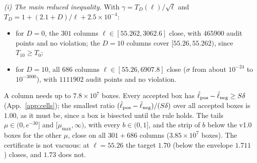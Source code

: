 \emph{(i) The main reduced inequality.}
With $\gamma=T_D(\ell)/\sqrt\ell$ and $T_D=1+(2.1+D)/\ell+2.5\times10^{-4}$:
\begin{itemize}
\item for $D=0$, the $301$ columns $\ell\in[55.262,3062.6]$ close, with $465900$ audit points and no violation; the $D=10$ columns cover $[55.26,55.262)$, since $T_{10}\ge T_0$;
\item for $D=10$, all $686$ columns $\ell\in[55.26,6907.8]$ close ($\sigma$ from about $10^{-24}$ to $10^{-3000}$), with $1111902$ audit points and no violation.
\end{itemize}
A column needs up to $7.8\times10^{7}$ boxes.
Every accepted box has $\hat\ell_{\rm pos}-\hat\ell_{\rm neg}\ge S\delta$ (App.~\ref{app:cells}); the smallest ratio $(\hat\ell_{\rm pos}-\hat\ell_{\rm neg})/(S\delta)$ over all accepted boxes is $1.00$, as it must be, since a box is bisected until the rule holds.
The tails $\mu\in(0,e^{-30}]$ and $[\mu_{\max},\infty)$, with every $b\in(0,1]$, and the strip of $b$ below the v1.0 boxes for the other $\mu$, close on all $301+686$ columns ($3.85\times10^{7}$ boxes).
The certificate is not vacuous: at $\ell=55.26$ the target $1.70$ (below the envelope $1.711$) closes, and $1.73$ does not.

